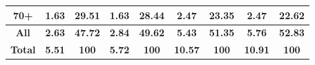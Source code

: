 \begin{landscape}
\begin{table}[htbp]
\begin{tabular}{c|cc|cc|cc|cc}
    70+   & 1.63   & 29.51 & 1.63   & 28.44 & 2.47  & 23.35 & 2.47  & 22.62 \\
    \midrule
    \textbf{All } & \textbf{2.63} & \textbf{47.72} & \textbf{2.84} & \textbf{49.62} & \textbf{5.43} & \textbf{51.35} & \textbf{5.76} & \textbf{52.83} \\
    \midrule
    \textbf{Total} & \textbf{5.51} & \textbf{100} & \textbf{5.72} & \textbf{100} & \textbf{10.57} & \textbf{100} & \textbf{10.91} & \textbf{100} \\
    \bottomrule
    \bottomrule
    \end{tabular}%
\end{table}%

\end{landscape}
